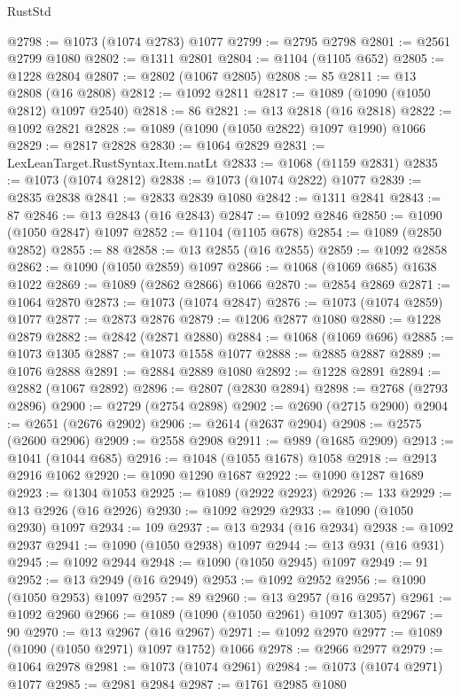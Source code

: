 \begin{lexlean}{RustStd}
\begin{coremodule}
{\begin{coremodule}
{{{{{{{{{{{{{{@2798 := @1073 (@1074 @2783) @1077
@2799 := @2795 @2798
@2801 := @2561 @2799 @1080
@2802 := @1311 @2801
@2804 := @1104 (@1105 @652)
@2805 := @1228 @2804
@2807 := @2802 (@1067 @2805)
@2808 := 85
@2811 := @13 @2808 (@16 @2808)
@2812 := @1092 @2811
@2817 := @1089 (@1090 (@1050 @2812) @1097 @2540)
@2818 := 86
@2821 := @13 @2818 (@16 @2818)
@2822 := @1092 @2821
@2828 := @1089 (@1090 (@1050 @2822) @1097 @1990) @1066
@2829 := @2817 @2828
@2830 := @1064 @2829
@2831 := LexLeanTarget.RustSyntax.Item.natLt
@2833 := @1068 (@1159 @2831)
@2835 := @1073 (@1074 @2812)
@2838 := @1073 (@1074 @2822) @1077
@2839 := @2835 @2838
@2841 := @2833 @2839 @1080
@2842 := @1311 @2841
@2843 := 87
@2846 := @13 @2843 (@16 @2843)
@2847 := @1092 @2846
@2850 := @1090 (@1050 @2847) @1097
@2852 := @1104 (@1105 @678)
@2854 := @1089 (@2850 @2852)
@2855 := 88
@2858 := @13 @2855 (@16 @2855)
@2859 := @1092 @2858
@2862 := @1090 (@1050 @2859) @1097
@2866 := @1068 (@1069 @685) @1638 @1022
@2869 := @1089 (@2862 @2866) @1066
@2870 := @2854 @2869
@2871 := @1064 @2870
@2873 := @1073 (@1074 @2847)
@2876 := @1073 (@1074 @2859) @1077
@2877 := @2873 @2876
@2879 := @1206 @2877 @1080
@2880 := @1228 @2879
@2882 := @2842 (@2871 @2880)
@2884 := @1068 (@1069 @696)
@2885 := @1073 @1305
@2887 := @1073 @1558 @1077
@2888 := @2885 @2887
@2889 := @1076 @2888
@2891 := @2884 @2889 @1080
@2892 := @1228 @2891
@2894 := @2882 (@1067 @2892)
@2896 := @2807 (@2830 @2894)
@2898 := @2768 (@2793 @2896)
@2900 := @2729 (@2754 @2898)
@2902 := @2690 (@2715 @2900)
@2904 := @2651 (@2676 @2902)
@2906 := @2614 (@2637 @2904)
@2908 := @2575 (@2600 @2906)
@2909 := @2558 @2908
@2911 := @989 (@1685 @2909)
@2913 := @1041 (@1044 @685)
@2916 := @1048 (@1055 @1678) @1058
@2918 := @2913 @2916 @1062
@2920 := @1090 @1290 @1687
@2922 := @1090 @1287 @1689
@2923 := @1304 @1053
@2925 := @1089 (@2922 @2923)
@2926 := 133
@2929 := @13 @2926 (@16 @2926)
@2930 := @1092 @2929
@2933 := @1090 (@1050 @2930) @1097
@2934 := 109
@2937 := @13 @2934 (@16 @2934)
@2938 := @1092 @2937
@2941 := @1090 (@1050 @2938) @1097
@2944 := @13 @931 (@16 @931)
@2945 := @1092 @2944
@2948 := @1090 (@1050 @2945) @1097
@2949 := 91
@2952 := @13 @2949 (@16 @2949)
@2953 := @1092 @2952
@2956 := @1090 (@1050 @2953) @1097
@2957 := 89
@2960 := @13 @2957 (@16 @2957)
@2961 := @1092 @2960
@2966 := @1089 (@1090 (@1050 @2961) @1097 @1305)
@2967 := 90
@2970 := @13 @2967 (@16 @2967)
@2971 := @1092 @2970
@2977 := @1089 (@1090 (@1050 @2971) @1097 @1752) @1066
@2978 := @2966 @2977
@2979 := @1064 @2978
@2981 := @1073 (@1074 @2961)
@2984 := @1073 (@1074 @2971) @1077
@2985 := @2981 @2984
@2987 := @1761 @2985 @1080
}}}}}}}}}}}}}}
\end{coremodule}}
\end{coremodule}
\end{lexlean}
